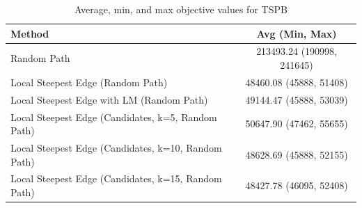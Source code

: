 \begin{table}[h!]
\centering
\begin{tabular}{lc}
\hline
Method & Avg (Min, Max) \\
\hline
Random Path & 213493.24 (190998, 241645) \\
Local Steepest Edge (Random Path) & 48460.08 (45888, 51408) \\
Local Steepest Edge with LM (Random Path) & 49144.47 (45888, 53039) \\
Local Steepest Edge (Candidates, k=5, Random Path) & 50647.90 (47462, 55655) \\
Local Steepest Edge (Candidates, k=10, Random Path) & 48628.69 (45888, 52155) \\
Local Steepest Edge (Candidates, k=15, Random Path) & 48427.78 (46095, 52408) \\
\hline
\end{tabular}
\caption{Average, min, and max objective values for TSPB}
\label{tab:TSPB_scores}
\end{table}

